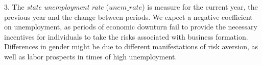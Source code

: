 3. The \textit{state unemployment rate} ($unem\_rate$) is measure for the current year, the previous year and the change between periods. We expect a negative coefficient on unemployment, as periods of economic downturn fail to provide the necessary incentives for individuals to take the risks associated with business formation. Differences in gender might be due to different manifestations of risk aversion, as well as labor prospects in times of high unemployment. 


































